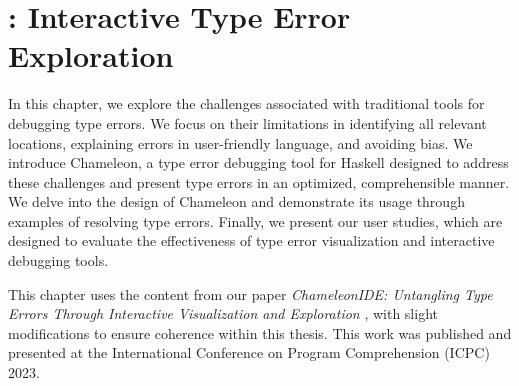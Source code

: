 \graphicspath{{Figures/Chameleon}}

\chapter{\chameleon{}: Interactive Type Error Exploration}


\label{chap:chameleon} 

In this chapter, we explore the challenges associated with traditional tools for debugging type errors. We focus on their limitations in identifying all relevant locations, explaining errors in user-friendly language, and avoiding bias. We introduce Chameleon, a type error debugging tool for Haskell designed to address these challenges and present type errors in an optimized, comprehensible manner. We delve into the design of Chameleon and demonstrate its usage through examples of resolving type errors. Finally, we present our user studies, which are designed to evaluate the effectiveness of type error visualization and interactive debugging tools.


 This chapter uses the content from our paper \textit{ChameleonIDE: Untangling Type Errors Through Interactive Visualization and
Exploration} \cite{Fu2023-fm}, with slight modifications to ensure coherence within this thesis. This work was published and presented at the International Conference on Program Comprehension (ICPC) 2023.








